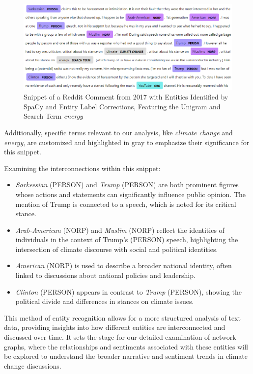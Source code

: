 \begin{figure}[h]
    \includegraphics[width=\textwidth]{images/topic_details/entities/displaCy.PNG}
    \caption{Snippet of a Reddit Comment from 2017 with Entities Identified by SpaCy and Entity Label Corrections, Featuring the Unigram and Search Term \emph{energy}\protect\footnotemark}
    \label{fig:displacy}
\end{figure}
Additionally, specific terms relevant to our analysis, like \emph{climate change} and \emph{energy}, are customized and highlighted in gray to emphasize their significance for this snippet.

Examining the interconnections within this snippet:
\begin{itemize}
    \item \emph{Sarkeesian} (PERSON) and \emph{Trump} (PERSON) are both prominent figures whose actions and statements can significantly influence public opinion. The mention of Trump is connected to a speech, which is noted for its critical stance.
    \item \emph{Arab-American} (NORP) and \emph{Muslim} (NORP) reflect the identities of individuals in the context of Trump's (PERSON) speech, highlighting the intersection of climate discourse with social and political identities.
    \item \emph{American} (NORP) is used to describe a broader national identity, often linked to discussions about national policies and leadership.
    \item \emph{Clinton} (PERSON) appears in contrast to \emph{Trump} (PERSON), showing the political divide and differences in stances on climate issues.
\end{itemize}

This method of entity recognition allows for a more structured analysis of text data, providing insights into how different entities are interconnected and discussed over time. It sets the stage for our detailed examination of network graphs, where the relationships and sentiments associated with these entities will be explored to understand the broader narrative and sentiment trends in climate change discussions.

